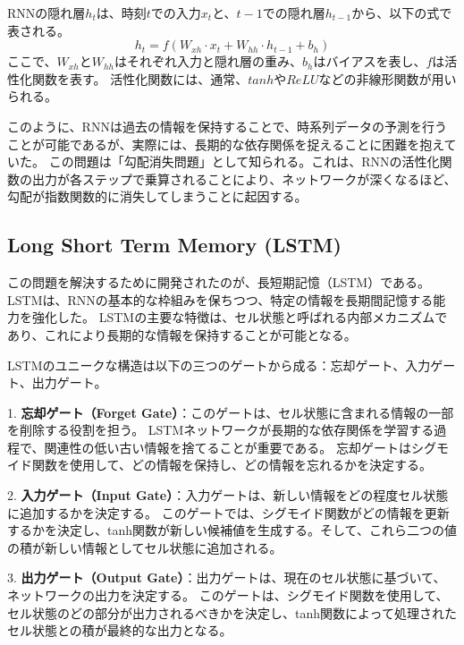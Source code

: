     RNNの隠れ層\( h_t \)は、時刻\( t \)での入力\( x_t \)と、\( t-1 \)での隠れ層\( h_{t-1} \)から、以下の式で表される。
    \begin{equation}
      h_t = f(W_{xh} \cdot x_t + W_{hh} \cdot h_{t-1} + b_h)
    \end{equation}
    ここで、\( W_{xh} \)と\( W_{hh} \)はそれぞれ入力と隠れ層の重み、\( b_h \)はバイアスを表し、\( f \)は活性化関数を表す。
    活性化関数には、通常、\( tanh \)や\( ReLU \)などの非線形関数が用いられる。

    このように、RNNは過去の情報を保持することで、時系列データの予測を行うことが可能であるが、実際には、長期的な依存関係を捉えることに困難を抱えていた。
    この問題は「勾配消失問題」として知られる。これは、RNNの活性化関数の出力が各ステップで乗算されることにより、ネットワークが深くなるほど、勾配が指数関数的に消失してしまうことに起因する。
    
    \subsection{Long Short Term Memory (LSTM)}
    この問題を解決するために開発されたのが、長短期記憶（LSTM）である。
    LSTMは、RNNの基本的な枠組みを保ちつつ、特定の情報を長期間記憶する能力を強化した。
    LSTMの主要な特徴は、セル状態と呼ばれる内部メカニズムであり、これにより長期的な情報を保持することが可能となる。

    LSTMのユニークな構造は以下の三つのゲートから成る：忘却ゲート、入力ゲート、出力ゲート。
    
    1. \textbf{忘却ゲート（Forget Gate）}：このゲートは、セル状態に含まれる情報の一部を削除する役割を担う。
    LSTMネットワークが長期的な依存関係を学習する過程で、関連性の低い古い情報を捨てることが重要である。
    忘却ゲートはシグモイド関数を使用して、どの情報を保持し、どの情報を忘れるかを決定する。
   
    2. \textbf{入力ゲート（Input Gate）}：入力ゲートは、新しい情報をどの程度セル状態に追加するかを決定する。
    このゲートでは、シグモイド関数がどの情報を更新するかを決定し、tanh関数が新しい候補値を生成する。そして、これら二つの値の積が新しい情報としてセル状態に追加される。
    
    3. \textbf{出力ゲート（Output Gate）}：出力ゲートは、現在のセル状態に基づいて、ネットワークの出力を決定する。
    このゲートは、シグモイド関数を使用して、セル状態のどの部分が出力されるべきかを決定し、tanh関数によって処理されたセル状態との積が最終的な出力となる。
    
